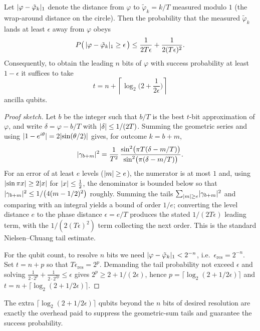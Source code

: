 \begin{theorem}
\label{l6:thm:precision}
Let $\lvert\varphi-\tilde\varphi_{k}\rvert_{1}$ denote the distance from $\varphi$ to
$\tilde\varphi_{k}=k/T$ measured modulo $1$ (the wrap-around distance on the
circle). Then the probability that the measured $\tilde\varphi_{k}$ lands at
least $\epsilon$ away from $\varphi$ obeys
\[
  P\big(\,\lvert\varphi-\tilde\varphi_{k}\rvert_{1}\ge\epsilon\,\big)
  \le \frac{1}{2T\epsilon}+\frac{1}{2(T\epsilon)^{2}} .
\]
Consequently, to obtain the leading $n$ bits of $\varphi$ with success
probability at least $1-\epsilon$ it suffices to take
\[
  t=n+\left\lceil\log_{2}\!\Big(2+\frac{1}{2\epsilon}\Big)\right\rceil
\]
ancilla qubits.
\end{theorem}

\begin{proof}[Proof sketch]
Let $b$ be the integer such that $b/T$ is the best $t$-bit approximation of
$\varphi$, and write $\delta=\varphi-b/T$ with $\lvert\delta\rvert\le 1/(2T)$.
Summing the geometric series and using
$\lvert1-e^{i\theta}\rvert=2\lvert\sin(\theta/2)\rvert$ gives, for outcome $k=b+m$,
\[
  \lvert\gamma_{b+m}\rvert^{2}
  =\frac{1}{T^{2}}\,
    \frac{\sin^{2}\!\big(\pi T(\delta-m/T)\big)}
         {\sin^{2}\!\big(\pi(\delta-m/T)\big)} .
\]
For an error of at least $e$ levels ($\lvert m\rvert\ge e$), the numerator is at most
$1$ and, using $\lvert\sin\pi x\rvert\ge 2\lvert x\rvert$ for $\lvert x\rvert\le\tfrac12$, the
denominator is bounded below so that
$\lvert\gamma_{b+m}\rvert^{2}\le 1/\big(4(m-1/2)^{2}\big)$ roughly. Summing the tails
$\sum_{\lvert m\rvert\ge e}\lvert\gamma_{b+m}\rvert^{2}$ and comparing with an integral
yields a bound of order $1/e$; converting the level distance $e$ to the phase
distance $\epsilon=e/T$ produces the stated $1/(2T\epsilon)$ leading term, with
the $1/(2(T\epsilon)^{2})$ term collecting the next order. This is the standard
Nielsen--Chuang tail estimate.

For the qubit count, to resolve $n$ bits we need
$\lvert\varphi-\tilde\varphi_{k}\rvert_{1}<2^{-n}$, i.e.\ $\epsilon_{\text{res}}=2^{-n}$.
Set $t=n+p$ so that $T\epsilon_{\text{res}}=2^{p}$. Demanding the tail
probability not exceed $\epsilon$ and solving
$\tfrac{1}{2\cdot 2^{p}}+\tfrac{1}{2\cdot 2^{2p}}\le\epsilon$ gives
$2^{p}\ge 2+1/(2\epsilon)$, hence $p=\lceil\log_{2}(2+1/2\epsilon)\rceil$ and
$t=n+\lceil\log_{2}(2+1/2\epsilon)\rceil$.
\end{proof}

The extra $\lceil\log_{2}(2+1/2\epsilon)\rceil$ qubits beyond the $n$ bits of
desired resolution are exactly the overhead paid to suppress the geometric-sum
tails and guarantee the success probability.

